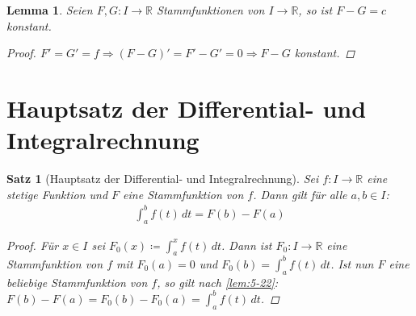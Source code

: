 \documentclass[ngerman,titlepage,twoside, parskip=half*]{scrreprt}
\newcommand*{\R}{\mathbb{R}}
\theoremstyle{break}
\newtheorem{lemma}{Lemma}
\newtheorem{theorem}{Satz}[section]
\theoremstyle{nonumberbreak}
\newtheorem{proof}{Beweis:}
\begin{document}
\begin{lemma}\label{lem:5-22}
  Seien $F,G\colon I\rightarrow\R$ Stammfunktionen von $I\rightarrow\R$, so
  ist $F-G=c$ konstant.
  \begin{proof}
    $F'=G'=f\Rightarrow(F-G)'=F'-G'=0\Rightarrow F-G$ konstant.
  \end{proof}
\end{lemma}

\section{Hauptsatz der Differential- und Integralrechnung}

\begin{theorem}[Hauptsatz der Differential- und Integralrechnung]\label{the:5-23}
  Sei $f\colon I\rightarrow\R$ eine stetige Funktion und $F$ eine
  Stammfunktion von $f$. Dann gilt für alle $a,b\in I$:
  \begin{gather*}
    \int_{a}^{b} f(t)\,dt= F(b)-F(a)
  \end{gather*}
  \begin{proof}
    Für $x\in I$ sei $F_{0}(x)\coloneqq\int_{a}^{x} f(t)\,dt$. Dann ist
    $F_{0}\colon I\rightarrow\R$ eine Stammfunktion von $f$ mit $F_{0}(a)=0$
    und $F_{0}(b)=\int_{a}^{b} f(t)\,dt$. Ist nun $F$ eine beliebige
    Stammfunktion von $f$, so gilt nach \autoref{lem:5-22}: $F(b)-F(a)=
    F_{0}(b)- F_{0}(a)= \int_{a}^{b} f(t)\,dt$.
  \end{proof}
\end{theorem}
\end{document}
